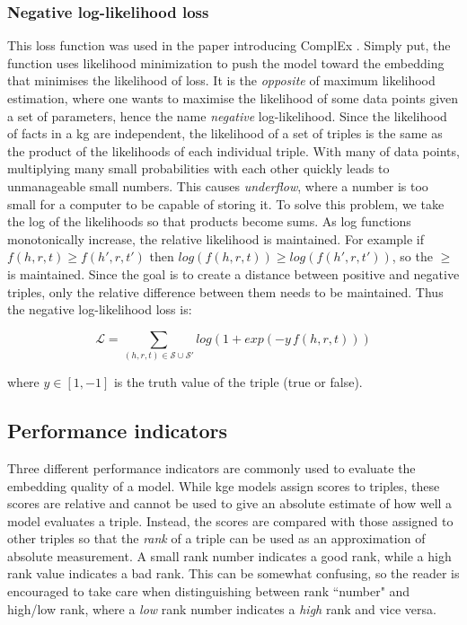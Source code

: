 \subsubsection{Negative log-likelihood loss}
This loss function was used in the paper introducing ComplEx \cite{complEx}. Simply put, the function uses likelihood minimization to push the model toward the embedding that minimises the likelihood of loss. It is the \textit{opposite} of maximum likelihood estimation, where one wants to maximise the likelihood of some data points given a set of parameters, hence the name \textit{negative} log-likelihood.
Since the likelihood of facts in a \gls{kg} are independent, the likelihood of a set of triples is the same as the product of the likelihoods of each individual triple. With many of data points, multiplying many small probabilities with each other quickly leads to unmanageable small numbers. This causes \textit{underflow}, where a number is too small for a computer to be capable of storing it. To solve this problem, we take the log of the likelihoods so that products become sums. As log functions monotonically increase, the relative likelihood is maintained. For example if $f(h,r,t) \geq f(h', r, t')$ then $log(f(h,r,t)) \geq log(f(h', r, t'))$, so the $\geq$ is maintained. Since the goal is to create a distance between positive and negative triples, only the relative difference between them needs to be maintained. Thus the negative log-likelihood loss is:

\[\mathcal{L}=\sum_{(h, r, t) \in \mathcal{S} \cup \mathcal{S'}}log(1+exp(-y \, f(h, r, t)))\]

where $y\in [1, -1]$ is the truth value of the triple (true or false).



    
\subsection{Performance indicators}
\label{Performance_indicators}
Three different performance indicators are commonly used to evaluate the embedding quality of a model. While \gls{kge} models assign scores to triples, these scores are relative and cannot be used to give an absolute estimate of how well a model evaluates a triple. Instead, the scores are compared with those assigned to other triples so that the \textit{rank} of a triple can be used as an approximation of absolute measurement. A small rank number indicates a good rank, while a high rank value indicates a bad rank. This can be somewhat confusing, so the reader is encouraged to take care when distinguishing between rank ``number" and high/low rank, where a \textit{low} rank number indicates a \textit{high} rank and vice versa.

